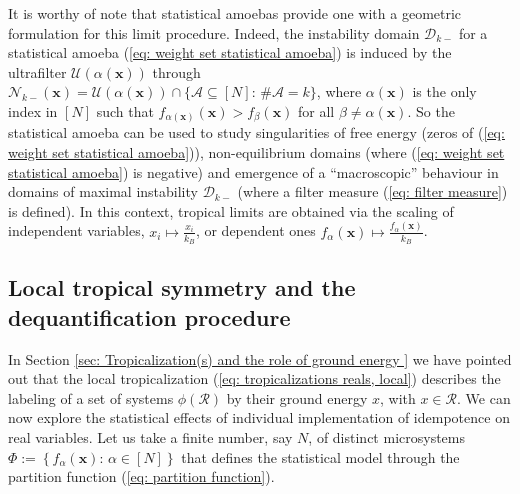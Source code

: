 \documentclass[11pt,british,reqno]{article}
\numberwithin{equation}{section}
\numberwithin{figure}{section}
\numberwithin{table}{section}
\theoremstyle{definition}
\theoremstyle{definition}
\theoremstyle{plain}
\theoremstyle{plain}
\theoremstyle{remark}
\theoremstyle{plain}
\numberwithin{equation}{section}
\numberwithin{figure}{section}
\numberwithin{table}{section}
\theoremstyle{plain}
\begin{document}
It is worthy of note that statistical amoebas \cite{AK2016b} provide
one with a geometric formulation for this limit procedure. Indeed,
the instability domain $\mathcal{D}_{k-}$ for a statistical amoeba
(\ref{eq: weight set statistical amoeba}) is induced by the ultrafilter $\mathcal{U}(\alpha(\boldsymbol{x}))$ through $\mathcal{N}_{k-}(\boldsymbol{x})=\mathcal{U}(\alpha(\boldsymbol{x}))\cap\{\mathcal{A}\subseteq[N]:\,\#\mathcal{A}=k\}$, where $\alpha(\boldsymbol{x})$ is the only index in $[N]$ such that $f_{\alpha(\boldsymbol{x})}(\boldsymbol{x})>f_{\beta}(\boldsymbol{x})$
for all $\beta\neq\alpha(\boldsymbol{x})$. So the statistical amoeba
can be used to study singularities of free energy (zeros of (\ref{eq: weight set statistical amoeba})), non-equilibrium domains (where (\ref{eq: weight set statistical amoeba}) is negative) and emergence of a ``macroscopic'' behaviour in domains of maximal instability $\mathcal{D}_{k-}$ (where a filter measure (\ref{eq: filter measure}) is defined). In this context, tropical limits are obtained via the scaling of independent variables, ${\displaystyle x_{i}\mapsto\frac{x_{i}}{k_{B}}}$, or dependent ones ${\displaystyle f_{\alpha}(\boldsymbol{x})\mapsto\frac{f_{\alpha}(\boldsymbol{x})}{k_{B}}}$. 

\subsection{\label{subsec: Local tropical symmetry and the dequantification procedure }
Local tropical symmetry and the dequantification procedure }

In Section \ref{sec: Tropicalization(s) and the role of ground energy } we have pointed out that the local tropicalization (\ref{eq: tropicalizations reals, local}) describes the labeling of a set of systems $\phi(\mathcal{R})$ by their ground energy $x$, with $x\in\mathcal{R}$. We can now explore the statistical effects of individual implementation of idempotence on real variables. Let us take a finite number, say $N$, of distinct microsystems $\Phi:=\left\{ f_{\alpha}(\boldsymbol{x}):\,\alpha\in[N]\right\} $
that defines the statistical model through the partition function
(\ref{eq: partition function}). 
\end{document}
